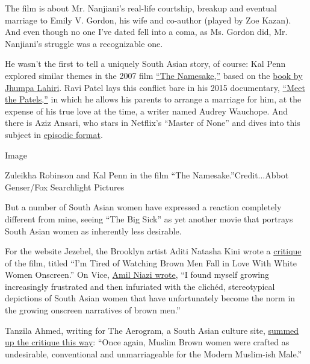 The film is about Mr. Nanjiani's real-life courtship, breakup and
eventual marriage to Emily V. Gordon, his wife and co-author (played by
Zoe Kazan). And even though no one I've dated fell into a coma, as Ms.
Gordon did, Mr. Nanjiani's struggle was a recognizable one.

He wasn't the first to tell a uniquely South Asian story, of course: Kal
Penn explored similar themes in the 2007 film
\href{http://www.nytimes.com/2007/03/09/movies/09name.html}{``The
Namesake,''} based on the
\href{http://www.nytimes.com/2003/09/02/books/books-of-the-times-from-calcutta-to-suburbia-a-family-s-perplexing-journey.html}{book
by Jhumpa Lahiri}. Ravi Patel lays this conflict bare in his 2015
documentary,
\href{https://www.nytimes.com/2015/09/11/movies/review-in-meet-the-patels-a-son-submits-to-a-marriage-quest.html}{``Meet
the Patels,''} in which he allows his parents to arrange a marriage for
him, at the expense of his true love at the time, a writer named Audrey
Wauchope. And there is Aziz Ansari, who stars in Netflix's ``Master of
None'' and dives into this subject in
\href{https://www.nytimes.com/2017/05/25/watching/master-of-none-critics-roundup.html}{episodic
format}.

Image

Zuleikha Robinson and Kal Penn in the film ``The
Namesake.''Credit...Abbot Genser/Fox Searchlight Pictures

But a number of South Asian women have expressed a reaction completely
different from mine, seeing ``The Big Sick'' as yet another movie that
portrays South Asian women as inherently less desirable.

For the website Jezebel, the Brooklyn artist Aditi Natasha Kini wrote a
\href{http://themuse.jezebel.com/i-m-tired-of-watching-brown-men-fall-in-love-with-white-1796522590}{critique}
of the film, titled ``I'm Tired of Watching Brown Men Fall in Love With
White Women Onscreen.'' On Vice,
\href{https://www.vice.com/en_us/article/zmvmp3/the-big-sick-is-great-and-its-also-stereotypical-toward-brown-women}{Amil
Niazi wrote}, ``I found myself growing increasingly frustrated and then
infuriated with the clichéd, stereotypical depictions of South Asian
women that have unfortunately become the norm in the growing onscreen
narratives of brown men.''

Tanzila Ahmed, writing for The Aerogram, a South Asian culture site,
\href{http://theaerogram.com/big-sick-brown-romance/?utm_content=buffer02d20\&utm_medium=social\&utm_source=facebook.com\&utm_campaign=buffer}{summed
up the critique this way}: ``Once again, Muslim Brown women were crafted
as undesirable, conventional and unmarriageable for the Modern
Muslim-ish Male.''

